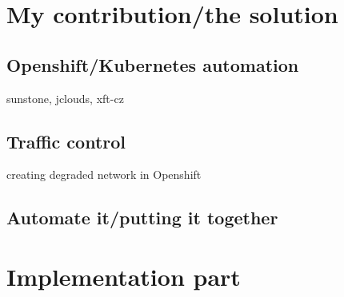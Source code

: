 \documentclass[
  master,
  biblatex,
  glossaries,
  index
]{kidiplom}
\begin{document}
\section{My contribution/the solution}

\subsection{Openshift/Kubernetes automation}

sunstone, jclouds, xft-cz

\subsection{Traffic control}

creating degraded network in Openshift

\subsection{Automate it/putting it together}

\section{Implementation part}


\printbibliography
\end{document}
